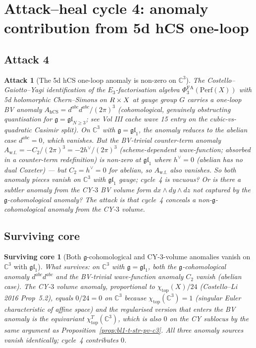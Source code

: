 \documentclass[11pt]{article}
\newtheorem{attack}[theorem]{Attack}
\newtheorem{surviving}[theorem]{Surviving core}
\providecommand{\hCS}{\mathrm{hCS}}
\providecommand{\Perf}{\mathrm{Perf}}
\providecommand{\fg}{\mathfrak{g}}
\providecommand{\fgl}{\mathfrak{gl}}
\providecommand{\C}{\mathbb{C}}
\providecommand{\PhiFA}{\Phi^{\mathrm{FA}}}
\begin{document}
\section{Attack--heal cycle 4: anomaly contribution from 5d hCS one-loop}
\label{sec:bl1-cycle-4}

\subsection{Attack 4}
\label{subsec:bl1-attack-4}

\begin{attack}[The 5d hCS one-loop anomaly is non-zero on $\C^3$]
\label{attack:bl1-hcs-anomaly}
The Costello--Gaiotto--Yagi identification of the $E_3$-factorisation
algebra $\PhiFA_3(\Perf(X))$ with 5d holomorphic Chern--Simons on
$R \times X$ at gauge group $G$ carries a one-loop BV anomaly
$A_{\hCS} = d^{abc} d^{abc}/(2\pi)^3$ (cohomological, genuinely
obstructing quantisation for $\fg = \fgl_{N \geq 3}$; see Vol III cache
wave 15 entry on the cubic-vs-quadratic Casimir split). On $\C^3$ with
$\fg = \fgl_1$, the anomaly reduces to the abelian case $d^{abc} = 0$,
which vanishes. But the BV-trivial counter-term anomaly
$A_{\mathrm{w.f.}} = -C_2/(2\pi)^3 = -2h^\vee/(2\pi)^3$ (scheme-dependent
wave-function; absorbed in a counter-term redefinition) is non-zero
at $\fgl_1$ where $h^\vee = 0$ (abelian has no dual Coxeter) --- but
$C_2 = h^\vee = 0$ for abelian, so $A_{\mathrm{w.f.}}$ also vanishes.
So both anomaly pieces vanish on $\C^3$ with $\fgl_1$ gauge; cycle~4
is vacuous? Or is there a subtler anomaly from the CY-$3$ BV volume
form $dx \wedge dy \wedge dz$ not captured by the $\fg$-cohomological
anomaly? The attack is that cycle~4 conceals a non-$\fg$-cohomological
anomaly from the CY-$3$ volume.
\end{attack}

\subsection{Surviving core}
\label{subsec:bl1-survive-4}

\begin{surviving}[Both $\fg$-cohomological and CY-$3$-volume anomalies
vanish on $\C^3$ with $\fgl_1$]
\label{survive:bl1-4}
What survives: on $\C^3$ with $\fg = \fgl_1$, both the $\fg$-cohomological
anomaly $d^{abc} d^{abc}$ and the BV-trivial wave-function anomaly $C_2$
vanish (abelian case). The CY-$3$ volume anomaly, proportional to
$\chi_{\mathrm{top}}(X)/24$ (Costello--Li 2016 Prop~5.2), equals
$0/24 = 0$ on $\C^3$ because
$\chi_{\mathrm{top}}(\C^3) = 1$ (singular Euler characteristic of
affine space) and the regularised version that enters the BV anomaly
is the equivariant $\chi^T_{\mathrm{top}}(\C^3)$, which is also $0$ on
the CY sublocus by the same argument as
Proposition~\ref{prop:bl1-t-str-pv-c3}. All three anomaly sources
vanish identically; cycle~4 contributes $0$.
\end{surviving}
\end{document}
